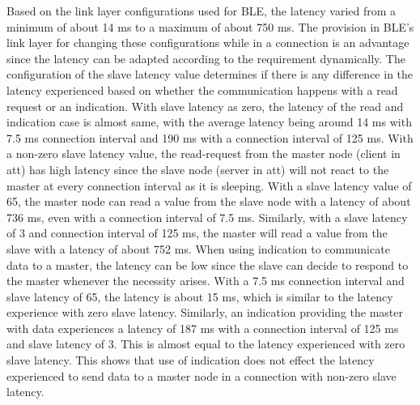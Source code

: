 Based on the link layer configurations used for BLE, the latency varied from a minimum of about 14 ms to a maximum of about 750 ms. The provision in BLE's link layer for changing these configurations while in a connection is an advantage since the latency can be adapted according to the requirement dynamically. The configuration of the slave latency value determines if there is any difference in the latency experienced based on whether the communication happens with a read request or an indication. With slave latency as zero, the latency of the read and indication case is almost same, with the average latency being around 14 ms with 7.5 ms connection interval and 190 ms with a connection interval of 125 ms. With a non-zero slave latency value, the read-request from the master node (client in \gls{att}) has high latency since the slave node (server in \gls{att}) will not react to the master at every connection interval as it is sleeping. With a slave latency value of 65, the master node can read a value from the slave node with a latency of about 736 ms, even with a connection interval of 7.5 ms. Similarly, with a slave latency of 3 and connection interval of 125 ms, the master will read a value from the slave with a latency of about 752 ms. When using indication to communicate data to a master, the latency can be low since the slave can decide to respond to the master whenever the necessity arises. With a 7.5 ms connection interval and slave latency of 65, the latency is about 15 ms, which is similar to the latency experience with zero slave latency. Similarly, an indication providing the master with data experiences a latency of 187 ms with a connection interval of 125 ms and slave latency of 3. This is almost equal to the latency experienced with zero slave latency. This shows that use of indication does not effect the latency experienced to send data to a master node in a connection with non-zero slave latency.

